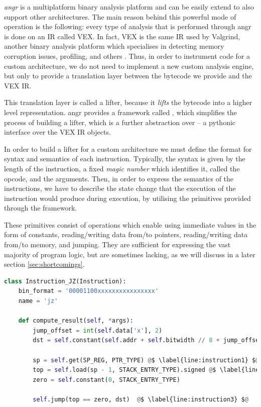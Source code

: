 \textit{angr} is a multiplatform binary analysis platform and can be easily extend to also support other architectures. The main reason behind this powerful mode of operation is the following: every type of analysis that is performed through angr is done on an \gls{IR} called VEX. In fact, VEX is the same \gls{IR} used by Valgrind, another binary analysis platform which specialises in detecting memory corruption issues, profiling, and others \cite{valgrind}. Thus, in order to instrument code for a custom architecture, we do not need to implement a new custom analysis engine, but only to provide a translation layer between the bytecode we provide and the VEX \gls{IR}. 

This translation layer is called a lifter, because it \emph{lifts} the bytecode into a higher level representation. angr provides a framework called , which simplifies the process of building a lifter, which is a further abstraction over  -- a pythonic interface over the VEX \gls{IR} objects.

In order to build a lifter for a custom architecture we must define the format for syntax and semantics of each instruction. Typically, the syntax is given by the length of the instruction, a fixed \emph{magic number} which identifies it, called the opcode, and the arguments. Then, in order to express the semantics of the instructions, we have to describe the state change that the execution of the instruction would produce during execution, by utilising the primitives provided through the  framework. 

These primitives consist of operations which enable using immediate values in the form of constants, reading/writing data from/to pointers, reading/writing data from/to memory, and jumping. They are sufficient for expressing the vast majority of program logic, but are sometimes lacking, as we will discuss in a later section \ref{sec:shortcomings}.

\begin{lstlisting}[language=python, label={lst:instruction}, caption={TODO}]
class Instruction_JZ(Instruction):
    bin_format = '00001100xxxxxxxxxxxxxxxx'
    name = 'jz'

    def compute_result(self, *args):
        jump_offset = int(self.data['x'], 2)
        dst = self.constant(self.addr + self.bitwidth // 8 + jump_offset, Type.int_16).signed @$ \label{line:instruction0} $@

        sp = self.get(SP_REG, PTR_TYPE) @$ \label{line:instruction1} $@
        top = self.load(sp - 1, STACK_ENTRY_TYPE).signed @$ \label{line:instruction2} $@
        zero = self.constant(0, STACK_ENTRY_TYPE)

        self.jump(top == zero, dst)  @$ \label{line:instruction3} $@
\end{lstlisting}

